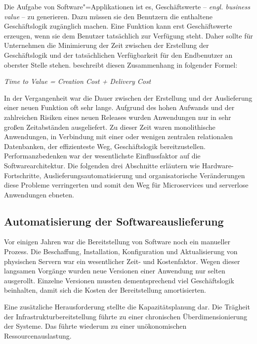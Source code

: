 Die Aufgabe von Software"=Applikationen ist es, Geschäftswerte -- \textit{engl. business value} -- zu generieren. Dazu müssen sie den Benutzern die enthaltene Geschäftslogik zugänglich machen. Eine Funktion kann erst Geschäftswerte erzeugen, wenn sie dem Benutzer tatsächlich zur Verfügung steht. Daher sollte für Unternehmen die Minimierung der Zeit zwischen der Erstellung der Geschäftslogik und der tatsächlichen Verfügbarkeit für den Endbenutzer an oberster Stelle stehen. \citeauthor{Cock16EvoFunc} beschreibt diesen Zusammenhang in folgender Formel:

\begin{center}
\textit{Time to Value = Creation Cost + Delivery Cost}
\end{center}

In der Vergangenheit war die Dauer zwischen der Erstellung und der Auslieferung einer neuen Funktion oft sehr lange. Aufgrund des hohen Aufwands und der zahlreichen Risiken eines neuen Releases wurden Anwendungen nur in sehr großen Zeitabständen ausgeliefert. Zu dieser Zeit waren monolithische Anwendungen, in Verbindung mit einer oder wenigen zentralen relationalen Datenbanken, der effizienteste Weg, Geschäftslogik bereitzustellen. Performanzbedenken war der wesentlichste Einflussfaktor auf die Softwarearchitektur. Die folgenden drei Abschnitte erläutern wie Hardware-Fortschritte, Auslieferungsautomatisierung und organisatorische Veränderungen diese Probleme verringerten und somit den Weg für Microservices und serverlose Anwendungen ebneten.

\subsection{Automatisierung der Softwareauslieferung}

Vor einigen Jahren war die Bereitstellung von Software noch ein manueller Prozess. Die Beschaffung, Installation, Konfiguration und Aktualisierung von physischen Servern war ein wesentlicher Zeit- und Kostenfaktor. Wegen dieser langsamen Vorgänge wurden neue Versionen einer Anwendung nur selten ausgerollt. Einzelne Versionen mussten dementsprechend viel Geschäftslogik beinhalten, damit sich die Kosten der Bereitstellung amortisierten.

Eine zusätzliche Herausforderung stellte die Kapazitätsplanung dar. Die Trägheit der Infrastrukturbereitstellung führte zu einer chronischen Überdimensionierung der Systeme. Das führte wiederum zu einer unökonomischen Ressourcenauslastung.

